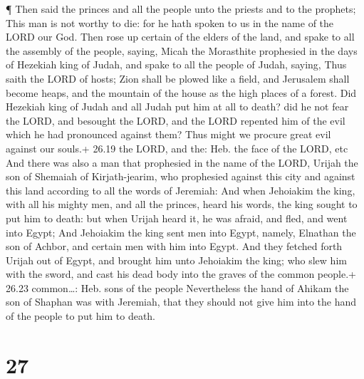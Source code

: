  ¶ Then said the princes and all the people unto the
priests and to the prophets; This man is not worthy to die: for he hath
spoken to us in the name of the LORD our God.  Then rose up
certain of the elders of the land, and spake to all the assembly of the
people, saying,  Micah the Morasthite prophesied in the
days of Hezekiah king of Judah, and spake to all the people of Judah,
saying, Thus saith the LORD of hosts; Zion shall be plowed like a field,
and Jerusalem shall become heaps, and the mountain of the house as the
high places of a forest.  Did Hezekiah king of Judah and
all Judah put him at all to death? did he not fear the LORD, and
besought the LORD, and the LORD repented him of the evil which he had
pronounced against them? Thus might we procure great evil against our
souls.+ 26.19 the LORD, and the: Heb. the face of the LORD, etc
 And there was also a man that prophesied in the name of
the LORD, Urijah the son of Shemaiah of Kirjath-jearim, who prophesied
against this city and against this land according to all the words of
Jeremiah:  And when Jehoiakim the king, with all his mighty
men, and all the princes, heard his words, the king sought to put him to
death: but when Urijah heard it, he was afraid, and fled, and went into
Egypt;  And Jehoiakim the king sent men into Egypt, namely,
Elnathan the son of Achbor, and certain men with him into Egypt.
 And they fetched forth Urijah out of Egypt, and brought
him unto Jehoiakim the king; who slew him with the sword, and cast his
dead body into the graves of the common people.+ 26.23 common\ldots:
Heb. sons of the people  Nevertheless the hand of Ahikam
the son of Shaphan was with Jeremiah, that they should not give him into
the hand of the people to put him to death.

\hypertarget{section-26}{%
\section{27}\label{section-26}}

